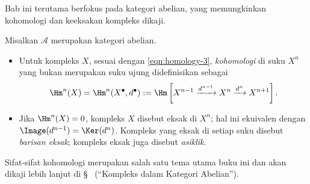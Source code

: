 Bab ini terutama berfokus pada kategori abelian, yang memungkinkan kohomologi
dan keeksakan kompleks dikaji.

\begin{definisi}\label{def:cohomology}
	Misalkan $\mathcal{A}$ merupakan kategori abelian.
	\begin{itemize}
		\item Untuk kompleks $X$, sesuai dengan \eqref{eqn:homology-3},
		\emph{kohomologi} di suku $X^n$ yang bukan merupakan suku ujung
		didefinisikan sebagai
		\[ \Hm^n(X) = \Hm^n(X^\bullet, d^\bullet) := \Hm\left[ X^{n-1} \xrightarrow{d^{n-1}} X^n \xrightarrow{d^n} X^{n+1}  \right]. \]
		\item Jika $\Hm^n(X) = 0$, kompleks $X$ disebut eksak di $X^n$;
		hal ini ekuivalen dengan $\Image(d^{n-1}) = \Ker(d^n)$. Kompleks yang
		eksak di setiap suku disebut \emph{barisan eksak}; kompleks eksak juga
		disebut \emph{asiklik}.
	\end{itemize}
\end{definisi}

Sifat-sifat kohomologi merupakan salah satu tema utama buku ini dan akan
dikaji lebih lanjut di \S~
(``Kompleks dalam Kategori Abelian'').

